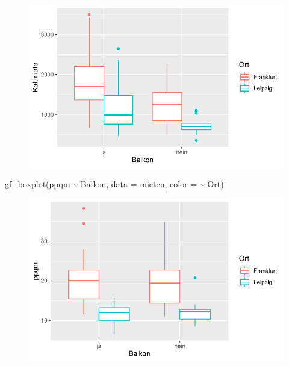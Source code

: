 \documentclass[
  a4paper,
  DIV=11]{scrartcl}
\newenvironment{Shaded}{\begin{snugshade}}{\end{snugshade}}
\newcommand{\AttributeTok}[1]{\textcolor[rgb]{0.40,0.45,0.13}{#1}}
\newcommand{\FunctionTok}[1]{\textcolor[rgb]{0.28,0.35,0.67}{#1}}
\newcommand{\NormalTok}[1]{\textcolor[rgb]{0.00,0.23,0.31}{#1}}
\newcommand{\SpecialCharTok}[1]{\textcolor[rgb]{0.37,0.37,0.37}{#1}}
\begin{document}
\begin{figure}[H]

{\centering \includegraphics{Mietmodellierung_files/figure-pdf/unnamed-chunk-13-1.pdf}

}

\end{figure}

\begin{Shaded}
\begin{Highlighting}[]
\FunctionTok{gf\_boxplot}\NormalTok{(ppqm }\SpecialCharTok{\textasciitilde{}}\NormalTok{ Balkon, }\AttributeTok{data =}\NormalTok{ mieten, }\AttributeTok{color =} \SpecialCharTok{\textasciitilde{}}\NormalTok{ Ort)}
\end{Highlighting}
\end{Shaded}

\begin{figure}[H]

{\centering \includegraphics{Mietmodellierung_files/figure-pdf/unnamed-chunk-13-2.pdf}

}

\end{figure}
\end{document}
